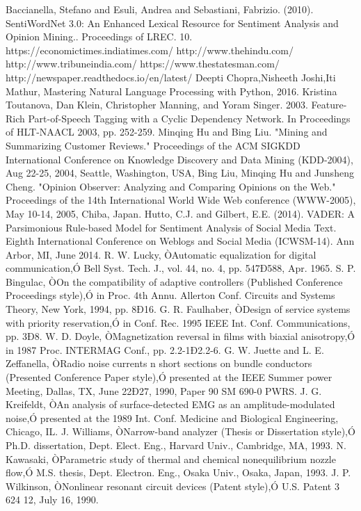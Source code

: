 \documentclass[a4paper, 10pt, conference]{ieeeconf}      %
\begin{document}
\begin{thebibliography}{99}
Baccianella, Stefano and Esuli, Andrea and Sebastiani, Fabrizio. (2010). SentiWordNet 3.0: An Enhanced Lexical Resource for Sentiment Analysis and Opinion Mining.. Proceedings of LREC. 10.
https://economictimes.indiatimes.com/
http://www.thehindu.com/
http://www.tribuneindia.com/
https://www.thestatesman.com/
 http://newspaper.readthedocs.io/en/latest/
Deepti Chopra,Nisheeth Joshi,Iti Mathur, Mastering Natural Language Processing with Python, 2016.
 Kristina Toutanova, Dan Klein, Christopher Manning, and Yoram Singer. 2003. Feature-Rich Part-of-Speech Tagging with a Cyclic Dependency Network. In Proceedings of HLT-NAACL 2003, pp. 252-259.
Minqing Hu and Bing Liu. "Mining and Summarizing Customer Reviews." 
 Proceedings of the ACM SIGKDD International Conference on Knowledge Discovery and Data Mining (KDD-2004), Aug 22-25, 2004, Seattle,     Washington, USA, 
Bing Liu, Minqing Hu and Junsheng Cheng. "Opinion Observer: Analyzing 
 and Comparing Opinions on the Web." Proceedings of the 14th 
International World Wide Web conference (WWW-2005), May 10-14,  2005, Chiba, Japan.
Hutto, C.J. and Gilbert, E.E. (2014). VADER: A Parsimonious Rule-based Model for Sentiment Analysis of Social Media Text. Eighth International Conference on
Weblogs and Social Media (ICWSM-14). Ann Arbor, MI, June 2014.
 R. W. Lucky, ÒAutomatic equalization for digital communication,Ó Bell Syst. Tech. J., vol. 44, no. 4, pp. 547Ð588, Apr. 1965.
 S. P. Bingulac, ÒOn the compatibility of adaptive controllers (Published Conference Proceedings style),Ó in Proc. 4th Annu. Allerton Conf. Circuits and Systems Theory, New York, 1994, pp. 8Ð16.
 G. R. Faulhaber, ÒDesign of service systems with priority reservation,Ó in Conf. Rec. 1995 IEEE Int. Conf. Communications, pp. 3Ð8.
 W. D. Doyle, ÒMagnetization reversal in films with biaxial anisotropy,Ó in 1987 Proc. INTERMAG Conf., pp. 2.2-1Ð2.2-6.
 G. W. Juette and L. E. Zeffanella, ÒRadio noise currents n short sections on bundle conductors (Presented Conference Paper style),Ó presented at the IEEE Summer power Meeting, Dallas, TX, June 22Ð27, 1990, Paper 90 SM 690-0 PWRS.
 J. G. Kreifeldt, ÒAn analysis of surface-detected EMG as an amplitude-modulated noise,Ó presented at the 1989 Int. Conf. Medicine and Biological Engineering, Chicago, IL.
 J. Williams, ÒNarrow-band analyzer (Thesis or Dissertation style),Ó Ph.D. dissertation, Dept. Elect. Eng., Harvard Univ., Cambridge, MA, 1993. 
 N. Kawasaki, ÒParametric study of thermal and chemical nonequilibrium nozzle flow,Ó M.S. thesis, Dept. Electron. Eng., Osaka Univ., Osaka, Japan, 1993.
 J. P. Wilkinson, ÒNonlinear resonant circuit devices (Patent style),Ó U.S. Patent 3 624 12, July 16, 1990. 






\end{thebibliography}
\end{document}
